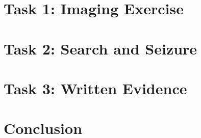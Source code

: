 \documentclass[oneside,openright,titlepage,numbers=noenddot,headinclude,footinclude=true,cleardoublepage=empty,listof=totoc,paper=a4,fontsize=11pt,english,BCOR=5mm]{scrreprt}
\begin{document}
  \frenchspacing
  \raggedbottom{}

  \pagestyle{plain}

  \singlespacing{}
  

  \onehalfspacing{}
  

  \cleardoublepage{}
  \pagestyle{scrheadings}
  \onehalfspacing{}

  \chapter{Task 1: Imaging Exercise}\label{c:Task-1}
  

  \chapter{Task 2: Search and Seizure}\label{c:Task-2}
  

  \chapter{Task 3: Written Evidence}\label{c:Task-3}
  
  

  \chapter{Conclusion}\label{c:Conclusion}
  

  \cleardoublepage{}
  \appendix

  \singlespacing{}
  
  \cleardoublepage{}
\end{document}
